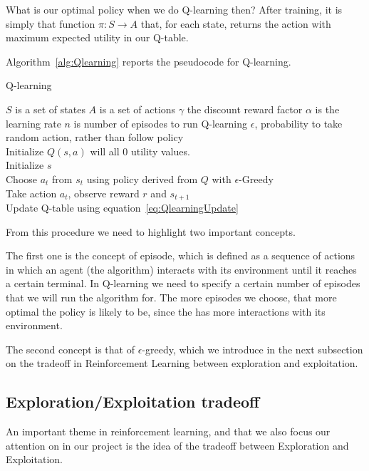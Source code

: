 What is our optimal policy when we do Q-learning then? After training, it is simply that function $\pi: S \to A$ that, for each state, returns the action with maximum expected utility in our Q-table.

Algorithm~\ref{alg:Qlearning} reports the pseudocode for Q-learning.

\begin{algorithm}
\caption{Q-learning}
\label{alg:Qlearning}
\begin{algorithmic}[1]
\Require
 	\State $S$ is a set of states
 	\State $A$ is a set of actions
 	\State $\gamma$ the discount reward factor
 	\State $\alpha$ is the learning rate
 	\State $n$ is number of episodes to run Q-learning
 	\State $\epsilon$, probability to take random action, rather than follow policy
 {}
\\Initialize $Q(s,a)$ will all 0 utility values.
\\ \qquad Initialize $s$
\\ \qquad \qquad Choose $a_t$ from $s_t$ using policy derived from $Q$ with $\epsilon$-Greedy
\\ \qquad \qquad Take action $a_t$, observe reward $r$ and $s_{t+1}$
\\ \qquad \qquad Update Q-table using equation~\ref{eq:QlearningUpdate}
\EndFor
\EndFor
\EndProcedure
\end{algorithmic}
\end{algorithm}

From this procedure we need to highlight two important concepts.

The first one is the concept of episode, which is defined as a sequence of actions in which an agent (the algorithm) interacts with its environment until it reaches a certain terminal. In Q-learning we need to specify a certain number of episodes that we will run the algorithm for. The more episodes we choose, that more optimal the policy is likely to be, since the has more interactions with its environment.

The second concept is that of $\epsilon$-greedy, which we introduce in the next subsection on the tradeoff in Reinforcement Learning between exploration and exploitation.

\subsection{Exploration/Exploitation tradeoff}
An important theme in reinforcement learning, and that we also focus our attention on in our project is the idea of the tradeoff between Exploration and Exploitation.

